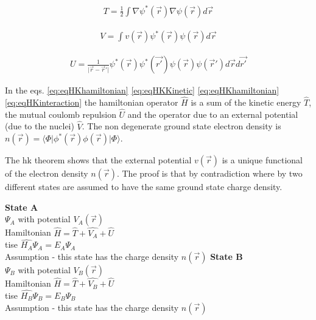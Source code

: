 \begin{equation}
\begin{split}
T = \frac{1}{2} \int \nabla \psi^{*}(\vec{r})\nabla \psi(\vec{r}) d\vec{r}
\end{split}
\label{eq:eqHKKinetic}
\end{equation}

\begin{equation}
\begin{split}
V = \int v(\vec{r}) \psi^{*}(\vec{r}) \psi (\vec{r}) d\vec{r} 
\end{split}
\label{eq:eqHKexternal}
\end{equation}

\begin{equation}
\begin{split}
U = \frac{1}{\lvert \vec{r} - \vec{r}' \rvert} \psi^{*}(\vec{r}) \psi^{*}(\vec{r'}) \psi(\vec{r}) \psi(\vec{r}') d\vec{r} d\vec{r'}
\end{split}
\label{eq:eqHKinteraction}
\end{equation}

In the eqs. \ref{eq:eqHKhamiltonian} \ref{eq:eqHKKinetic} \ref{eq:eqHKhamiltonian} \ref{eq:eqHKinteraction} the hamiltonian operator $\hat{H}$ is a sum of the kinetic energy $\hat{T}$, the mutual coulomb repulsion $\hat{U}$ and the operator due to an external potential (due to the nuclei) $\hat{V}$.  The non degenerate ground state electron density is $n(\vec{r}) = \langle \Phi \lvert \phi^{*}(\vec{r}) \phi(\vec{r}) \rvert \Phi \rangle$.

The \acrshort{hk} theorem shows that the external potential $v(\vec{r})$ is a unique functional of the electron density $n(\vec{r})$.  The proof is that by contradiction where by two different states are assumed to have the same ground state charge density.


\centering
\textbf{State A} \\
$\Psi_{A}$ with potential $V_A(\vec{r})$ \\
Hamiltonian $\hat{H} = \hat{T} + \hat{V_A} + \hat{U}$ \\
\acrshort{tise} $\hat{H_A} \Psi_A = E_A \Psi_A$\\
Assumption - this state has the charge density $n(\vec{r})$
\endminipage
{}
\centering
\textbf{State B} \\
$\Psi_{B}$ with potential $V_B(\vec{r})$ \\
Hamiltonian $\hat{H} = \hat{T} + \hat{V_B} + \hat{U}$ \\
\acrshort{tise} $\hat{H_B} \Psi_B = E_B \Psi_B$\\
Assumption - this state has the charge density $n(\vec{r})$
\endminipage

